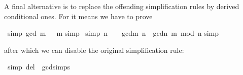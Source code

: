 \begin{isabellebody}
\begin{isamarkuptext}
A final alternative is to replace the offending simplification rules by
derived conditional ones. For  it means we have to prove%
\end{isamarkuptext}%
\ {\isacharbrackleft}simp{\isacharbrackright}{\isacharcolon}\ {\isachardoublequote}gcd\ {\isacharparenleft}m{\isacharcomma}\ \ {\isacharequal}\ m{\isachardoublequote}\isanewline
{}simp{\isacharparenright}\isanewline
{}\ {\isacharbrackleft}simp{\isacharbrackright}{\isacharcolon}\ {\isachardoublequote}n\ {\isasymnoteq}\ \ {\isasymLongrightarrow}\ gcd{\isacharparenleft}m{\isacharcomma}\ n{\isacharparenright}\ {\isacharequal}\ gcd{\isacharparenleft}n{\isacharcomma}\ m\ mod\ n{\isacharparenright}{\isachardoublequote}\isanewline
{}simp{\isacharparenright}%
\begin{isamarkuptext}%
\noindent
after which we can disable the original simplification rule:%
\end{isamarkuptext}%
\ {\isacharbrackleft}simp\ del{\isacharbrackright}\ {\isacharequal}\ gcd{\isachardot}simps\isanewline
\end{isabellebody}%

